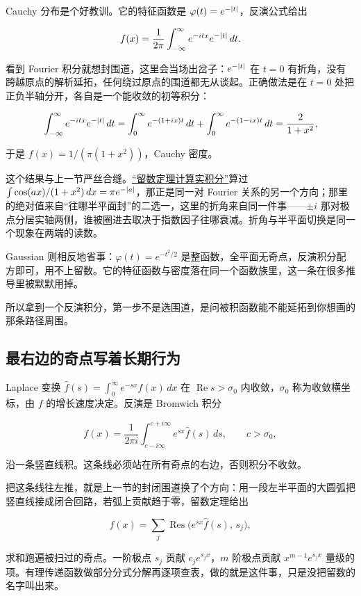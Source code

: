 Cauchy 分布是个好教训。它的特征函数是 \(\varphi(t)=e^{-\left|t\right|}\)，反演公式给出

\[
f(x)=\frac1{2\pi}\int_{-\infty}^{\infty}e^{-itx}e^{-\left|t\right|}\,dt .
\]

看到 Fourier 积分就想封围道，这里会当场出岔子：\(e^{-\left|t\right|}\) 在 \(t=0\) 有折角，没有跨越原点的解析延拓，任何绕过原点的围道都无从谈起。正确做法是在 \(t=0\) 处把正负半轴分开，各自是一个能收敛的初等积分：

\[
\int_{-\infty}^{\infty}e^{-itx}e^{-\left|t\right|}\,dt
=\int_0^\infty e^{-(1+ix)t}\,dt+\int_0^\infty e^{-(1-ix)t}\,dt
=\frac{2}{1+x^2},
\]

于是 \(f(x)=1/(\pi(1+x^2))\)，Cauchy 密度。

这个结果与上一节严丝合缝。\hyperref[sec:08-Numerical-Analysis/09-Complex-Analysis-and-Residues/02]{``留数定理计算实积分''}算过 \(\int\cos(ax)/(1+x^2)\,dx=\pi e^{-\left|a\right|}\)，那正是同一对 Fourier 关系的另一个方向；那里的绝对值来自``往哪半平面封''的二选一，这里的折角来自同一件事——\(\pm i\) 那对极点分居实轴两侧，谁被圈进去取决于指数因子往哪衰减。折角与半平面切换是同一个现象在两端的读数。

Gaussian 则相反地省事：\(\varphi(t)=e^{-t^2/2}\) 是整函数，全平面无奇点，反演积分配方即可，用不上留数。它的特征函数与密度落在同一个函数族里，这一条在很多推导里被默默用掉。

所以拿到一个反演积分，第一步不是选围道，是问被积函数能不能延拓到你想画的那条路径周围。

\subsection{最右边的奇点写着长期行为}

Laplace 变换 \(\hat f(s)=\int_0^\infty e^{-sx}f(x)\,dx\) 在 \(\operatorname{Re}s>\sigma_0\) 内收敛，\(\sigma_0\) 称为收敛横坐标，由 \(f\) 的增长速度决定。反演是 Bromwich 积分

\[
f(x)=\frac1{2\pi i}\int_{c-i\infty}^{c+i\infty}e^{sx}\hat f(s)\,ds,\qquad c>\sigma_0,
\]

沿一条竖直线积。这条线必须站在所有奇点的右边，否则积分不收敛。

把这条线往左推，就是上一节的封闭围道换了个方向：用一段左半平面的大圆弧把竖直线接成闭合回路，若弧上贡献趋于零，留数定理给出

\[
f(x)=\sum_j\operatorname{Res}\bigl(e^{sx}\hat f(s),\,s_j\bigr),
\]

求和跑遍被扫过的奇点。一阶极点 \(s_j\) 贡献 \(c_j e^{s_j x}\)，\(m\) 阶极点贡献 \(x^{m-1}e^{s_j x}\) 量级的项。有理传递函数做部分分式分解再逐项查表，做的就是这件事，只是没把留数的名字叫出来。

